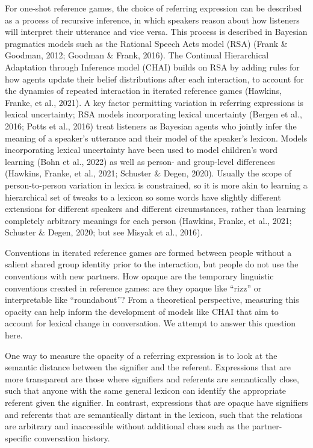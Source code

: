 \documentclass[10pt, letterpaper]{article}
\begin{document}
For one-shot reference games, the choice of referring expression can be
described as a process of recursive inference, in which speakers reason
about how listeners will interpret their utterance and vice versa. This
process is described in Bayesian pragmatics models such as the Rational
Speech Acts model (RSA) (Frank \& Goodman, 2012; Goodman \& Frank,
2016). The Continual Hierarchical Adaptation through Inference model
(CHAI) builds on RSA by adding rules for how agents update their belief
distributions after each interaction, to account for the dynamics of
repeated interaction in iterated reference games (Hawkins, Franke, et
al., 2021). A key factor permitting variation in referring expressions
is lexical uncertainty; RSA models incorporating lexical uncertainty
(Bergen et al., 2016; Potts et al., 2016) treat listeners as Bayesian
agents who jointly infer the meaning of a speaker's utterance and their
model of the speaker's lexicon. Models incorporating lexical uncertainty
have been used to model children's word learning (Bohn et al., 2022) as
well as person- and group-level differences (Hawkins, Franke, et al.,
2021; Schuster \& Degen, 2020). Usually the scope of person-to-person
variation in lexica is constrained, so it is more akin to learning a
hierarchical set of tweaks to a lexicon so some words have slightly
different extensions for different speakers and different circumstances,
rather than learning completely arbitrary meanings for each person
(Hawkins, Franke, et al., 2021; Schuster \& Degen, 2020; but see Misyak
et al., 2016).

Conventions in iterated reference games are formed between people
without a salient shared group identity prior to the interaction, but
people do not use the conventions with new partners. How opaque are the
temporary linguistic conventions created in reference games: are they
opaque like ``rizz'' or interpretable like ``roundabout''? From a
theoretical perspective, measuring this opacity can help inform the
development of models like CHAI that aim to account for lexical change
in conversation. We attempt to answer this question here.

One way to measure the opacity of a referring expression is to look at
the semantic distance between the signifier and the referent.
Expressions that are more transparent are those where signifiers and
referents are semantically close, such that anyone with the same general
lexicon can identify the appropriate referent given the signifier. In
contrast, expressions that are opaque have signifiers and referents that
are semantically distant in the lexicon, such that the relations are
arbitrary and inaccessible without additional clues such as the
partner-specific conversation history.
\end{document}
